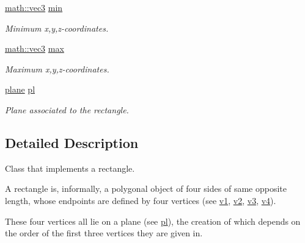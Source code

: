 \begin{DoxyCompactItemize}
\hyperlink{structphysim_1_1math_1_1vec3}{math\+::vec3} \hyperlink{classphysim_1_1geom_1_1rectangle_aad05936916427bd622311fa878824075}{min}
\begin{DoxyCompactList}\small\item\em Minimum x,y,z-\/coordinates. \end{DoxyCompactList}\item 
\mbox{\label{classphysim_1_1geom_1_1rectangle_aa533258055fa660b6059680cea3a3494}} 
\hyperlink{structphysim_1_1math_1_1vec3}{math\+::vec3} \hyperlink{classphysim_1_1geom_1_1rectangle_aa533258055fa660b6059680cea3a3494}{max}
\begin{DoxyCompactList}\small\item\em Maximum x,y,z-\/coordinates. \end{DoxyCompactList}\item 
\mbox{\label{classphysim_1_1geom_1_1rectangle_aaf289e8860e9cd816d3ea93da2adde9a}} 
\hyperlink{classphysim_1_1geom_1_1plane}{plane} \hyperlink{classphysim_1_1geom_1_1rectangle_aaf289e8860e9cd816d3ea93da2adde9a}{pl}
\begin{DoxyCompactList}\small\item\em Plane associated to the rectangle. \end{DoxyCompactList}\end{DoxyCompactItemize}


\subsection{Detailed Description}
Class that implements a rectangle. 

A rectangle is, informally, a polygonal object of four sides of same opposite length, whose endpoints are defined by four vertices (see \hyperlink{classphysim_1_1geom_1_1rectangle_aac95bbc1e8bc67ddf94a68b80a5634a3}{v1}, \hyperlink{classphysim_1_1geom_1_1rectangle_aecbfa6f5fe448539a7267e75ed3dd1bc}{v2}, \hyperlink{classphysim_1_1geom_1_1rectangle_a3101e16d7a6c9a22b1cdadd150112a7f}{v3}, \hyperlink{classphysim_1_1geom_1_1rectangle_a86d362233b694d57f32749d954a80d48}{v4}).

These four vertices all lie on a plane (see \hyperlink{classphysim_1_1geom_1_1rectangle_aaf289e8860e9cd816d3ea93da2adde9a}{pl}), the creation of which depends on the order of the first three vertices they are given in. 

